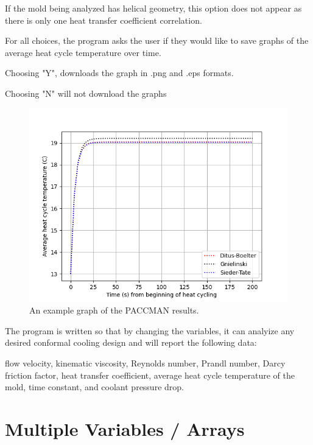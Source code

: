 \documentclass[a4paper,12pt]{article}
\begin{document}
If the mold being analyzed has helical geometry, this option does not appear as there is only one heat transfer coefficient correlation.

\medskip

For all choices, the program asks the user if they would like to save graphs of the average heat cycle temperature over time.
\begin{adjustwidth}{1cm}{}
Choosing "Y", downloads the graph in .png and .eps formats.

Choosing "N" will not download the graphs
\end{adjustwidth}

\clearpage

\medskip
\begin{center}
\begin{figure}
\centering
\includegraphics[width=12cm]{paccman-example-graph.png}
\caption{An example graph of the PACCMAN results. }
\end{figure}
\end{center}

The program is written so that by changing the variables, it can analyize any desired conformal cooling design and will report the following data: 
\begin{adjustwidth}{1cm}{}

flow velocity, kinematic viscosity, Reynolds number, Prandl number, Darcy friction factor, heat transfer coefficient, average heat cycle temperature of the mold, time constant, and coolant pressure drop.

\end{adjustwidth}
\clearpage

\section*{Multiple Variables / Arrays}
\end{document}
